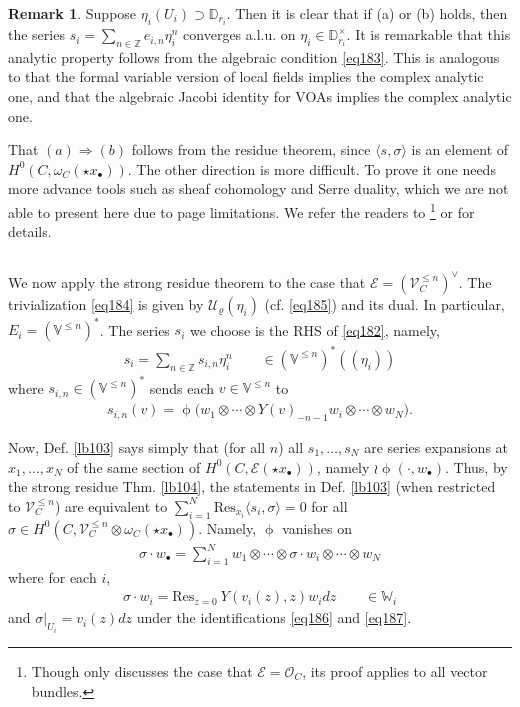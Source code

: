 \documentclass[11pt,b5paper,notitlepage]{article}
\theoremstyle{definition}
\newtheorem{rem}[df]{Remark}
\theoremstyle{plain}
\newcommand{\mc}{\mathcal}
\newcommand{\Res}{\mathrm{Res}}
\newcommand{\bk}[1]{\langle {#1}\rangle}
\newcommand{\scr}{\mathscr}
\newcommand{\blt}{\bullet}
\newcommand{\Vbb}{\mathbb V}
\newcommand{\Wbb}{\mathbb W}
\newcommand{\Zbb}{\mathbb Z}
\newcommand{\Dbb}{\mathbb D}
\numberwithin{equation}{section}
\begin{document}
\begin{rem}
Suppose $\eta_i(U_i)\supset\Dbb_{r_i}$. Then it is clear that if (a) or (b) holds, then the series $s_i=\sum_{n\in\Zbb} e_{i,n}\eta_i^n$ converges a.l.u. on $\eta_i\in\Dbb_{r_i}^\times$.  It is remarkable that this analytic property follows from the algebraic condition \eqref{eq183}. This is analogous to that the formal variable version of local fields implies the complex analytic one, and that the algebraic Jacobi identity for VOAs implies the complex analytic one.
\end{rem}

That $(a)\Rightarrow(b)$ follows from the residue theorem, since $\bk{s,\sigma}$ is an element of $H^0(C,\omega_C(\star x_\blt))$. The other direction is more difficult. To prove it one needs more advance tools  such as sheaf cohomology and Serre duality, which we are not able to present here due to page limitations. We refer the readers to \cite[Sec. 1.2.2]{Muk10}\footnote{Though \cite{Muk10} only discusses the case that $\scr E=\scr O_C$, its proof applies to all vector bundles.} or \cite[Sec. 1.4]{Gui} for details.



\subsection{}


We now apply the strong residue theorem to the case that $\scr E=(\scr V_C^{\leq n})^\vee$. The trivialization \eqref{eq184} is given by $\mc U_\varrho(\eta_i)$ (cf. \eqref{eq185}) and its dual. In particular, $E_i=(\Vbb^{\leq n})^*$. The series $s_i$  we choose is the RHS of \eqref{eq182}, namely,
\begin{align*}
s_i=\sum_{n\in\Zbb}s_{i,n}\eta_i^n\qquad \in (\Vbb^{\leq n})^*((\eta_i))
\end{align*}
where $s_{i,n}\in (\Vbb^{\leq n})^*$ sends each $v\in\Vbb^{\leq n}$ to
\begin{align*}
s_{i,n}(v)=\upphi\big(w_1\otimes\cdots\otimes Y(v)_{-n-1}w_i\otimes\cdots\otimes w_N\big).
\end{align*}


Now, Def. \ref{lb103} says simply that (for all $n$) all $s_1,\dots,s_N$ are series expansions at $x_1,\dots,x_N$ of the same section of $H^0(C,\scr E(\star x_\blt))$, namely $\wr\upphi(\cdot,w_\blt)$. Thus, by the strong residue Thm. \ref{lb104}, the statements in Def. \ref{lb103} (when restricted to $\scr V^{\leq n}_C$) are equivalent to $\sum_{i=1}^N \Res_{x_i}\bk{s_i,\sigma}=0$ for all $\sigma\in H^0(C,\scr V_C^{\leq n}\otimes\omega_C(\star x_\blt))$. Namely, $\upphi$ vanishes on
\begin{align}
\sigma\cdot w_\blt=\sum_{i=1}^N w_1\otimes\cdots \otimes \sigma\cdot w_i\otimes\cdots\otimes w_N\label{eq188}
\end{align}
where for each $i$,
\begin{gather}
\sigma\cdot w_i=\Res_{z=0} ~Y(v_i(z),z)w_idz \qquad\in\Wbb_i\label{eq190}
\end{gather}
and $\sigma|_{U_i}=v_i(z)dz$ under the identifications \eqref{eq186} and \eqref{eq187}. 
\end{document}
